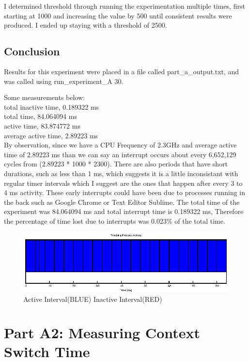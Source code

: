 \documentclass{article}
\begin{document}
I determined threshold through running the experimentation multiple times, first starting at 1000 and increasing the value by 500 until consistent results were produced. I ended up  staying with a threshold of 2500.

\subsection{Conclusion}

Results for this experiment were placed in a file called part\_a\_output.txt, and was called using run\_experiment\_A 30.

Some measurements below: \\

total inactive time,  0.189322 ms \\ 

total time, 84.064094 ms \\
active time, 83.874772 ms \\
average active time, 2.89223 ms \\


By observation, since we have a CPU Frequency of 2.3GHz and average active time of 2.89223 ms than we can say an interrupt occurs about every 6,652,129 cycles from (2.89223 * 1000 * 2300). There are also periods that have short durations, such as less than 1 ms, which suggests it is a little inconsistant with regular timer intervals which I suggest are the ones that happen after every 3 to 4 ms activity. These early interrupts could have been due to processes running in the back such as Google Chrome or Text Editor Sublime.
The total time of the experiment was 84.064094 ms and total interrupt time is 0.189322 ms, Therefore the percentage of time lost due to interrupts was 0.023\% of the total time.

\begin{figure}
\centering
\includegraphics[scale=1.25]{part_a.eps}
\caption{Active \- Interval(BLUE) Inactive \- Interval(RED)}
\label{fig:parta}
\end{figure}

\section{Part A2: Measuring Context Switch Time}
\end{document}
